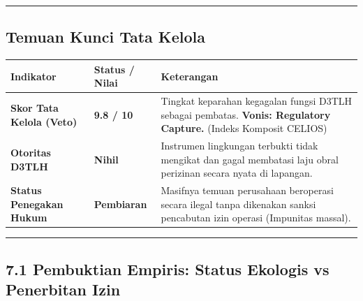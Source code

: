 \documentclass[
]{article}
\newcounter{none} %
\begin{document}
\begin{center}\rule{0.5\linewidth}{0.5pt}\end{center}

\subsection{Temuan Kunci Tata Kelola}\label{temuan-kunci-tata-kelola}

{\def\LTcaptype{none} %
\begin{longtable}[]{@{}
  >{\raggedright\arraybackslash}p{}
  >{\raggedright\arraybackslash}p{}
  >{\raggedright\arraybackslash}p{}@{}}
\toprule\noalign{}
\begin{minipage}[b]{\linewidth}\raggedright
Indikator
\end{minipage} & \begin{minipage}[b]{\linewidth}\raggedright
Status / Nilai
\end{minipage} & \begin{minipage}[b]{\linewidth}\raggedright
Keterangan
\end{minipage} \\
\midrule\noalign{}
\endhead
\bottomrule\noalign{}
\endlastfoot
\textbf{Skor Tata Kelola (Veto)} & \textbf{9.8 / 10} & Tingkat keparahan
kegagalan fungsi D3TLH sebagai pembatas. \textbf{Vonis: Regulatory
Capture.} (Indeks Komposit CELIOS) \\
\textbf{Otoritas D3TLH} & \textbf{Nihil} & Instrumen lingkungan terbukti
tidak mengikat dan gagal membatasi laju obral perizinan secara nyata di
lapangan. \\
\textbf{Status Penegakan Hukum} & \textbf{Pembiaran} & Masifnya temuan
perusahaan beroperasi secara ilegal tanpa dikenakan sanksi pencabutan
izin operasi (Impunitas massal). \\
\end{longtable}
}

\begin{center}\rule{0.5\linewidth}{0.5pt}\end{center}

\subsection{7.1 Pembuktian Empiris: Status Ekologis vs Penerbitan
Izin}\label{pembuktian-empiris-status-ekologis-vs-penerbitan-izin}
\end{document}
